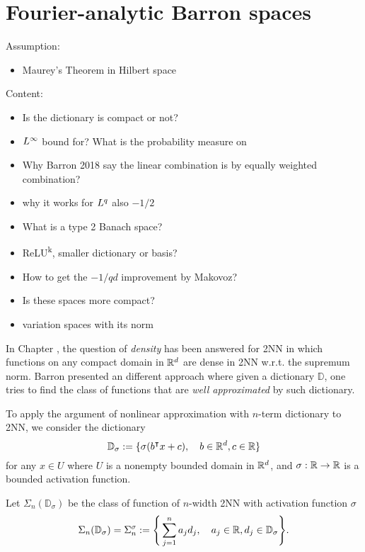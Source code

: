 \chapter{Fourier-analytic Barron spaces}
\label{sec:fourier}


Assumption:
\begin{itemize}
    \item Maurey's Theorem in Hilbert space
\end{itemize}

Content:
\begin{itemize}
    \item Is the dictionary is compact or not?
    \item $L^{\infty}$ bound for? What is the probability measure on
    \item Why Barron 2018 say the linear combination is by equally weighted
    combination?
    \item why it works for $L^{q}$ also $-1/2$
    \item What is a type 2 Banach space?
    \item ReLU\textsuperscript{k}, smaller dictionary or basis?
    \item How to get the $-1/q d$ improvement by Makovoz?
    \item Is these spaces more compact?
    \item variation spaces with its norm
\end{itemize}

In Chapter \TODO, the question of \textit{density} has been answered for 2NN in
which functions on any compact domain in $\mathbb{R}^d$ are dense in 2NN w.r.t. the
supremum norm. Barron presented an different approach where given a dictionary
$\mathbb{D}$, one tries to find the class of functions that are \textit{well
approximated} by such dictionary.

To apply the argument of nonlinear approximation with $n$-term dictionary    to
2NN, we consider the dictionary
\begin{equation}
    \mathbb{D}_{\sigma} := \{
        \sigma(b{}^{\intercal} x + c), \quad b\in\mathbb{R}^d, c\in\mathbb{R}
    \}
\end{equation}
for any $x \in U$ where $U$ is a nonempty bounded domain in $\mathbb{R}^d$, and
$\sigma:\mathbb{R}\to\mathbb{R}$ is a bounded activation function.

Let $\Sigma_n(\mathbb{D}_{\sigma})$ be the class of function of $n$-width 2NN
with activation function $\sigma$
\begin{equation}
    \Sigma_n(\mathbb{D}_{\sigma}) = \Sigma_n^{\sigma}
    := \Bigg\{
        \sum_{j=1}^n a_j d_j, \quad a_j\in\mathbb{R}, d_j\in \mathbb{D}_{\sigma}
    \Bigg\}.
\end{equation}

